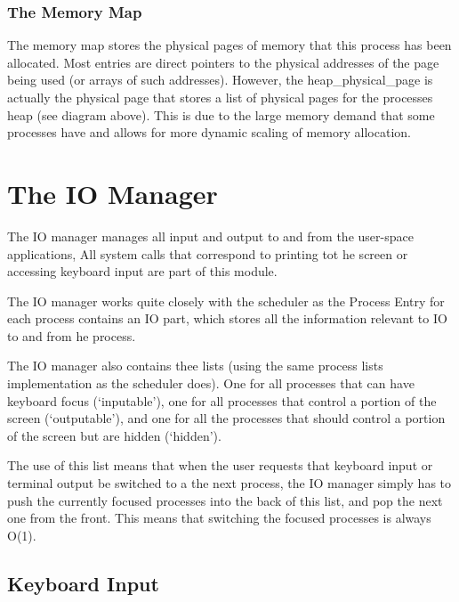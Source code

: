 \documentclass[a4paper]{report}
\begin{document}
\subsubsection{The Memory Map}

The memory map stores the physical pages of memory that this process has been allocated. Most entries are direct pointers to the physical addresses of the page being used (or arrays of such addresses). However, the heap\_physical\_page is actually the physical page that stores a list of physical pages for the processes heap (see diagram above). This is due to the large memory demand that some processes have and allows for more dynamic scaling of memory allocation.


















\clearpage

\section{The IO Manager}

The IO manager manages all input and output to and from the user-space applications, All system calls that correspond to printing tot he screen or accessing keyboard input are part of this module.

The IO manager works quite closely with the scheduler as the Process Entry for each process contains an IO part, which stores all the information relevant to IO to and from he process.

The IO manager also contains thee lists (using the same process lists implementation as the scheduler does). One for all processes that can have keyboard focus (`inputable'), one for all processes that control a portion of the screen (`outputable'), and one for all the processes that should control a portion of the screen but are hidden (`hidden').

The use of this list means that when the user requests that keyboard input or terminal output be switched to a the next process, the IO manager simply has to push the currently focused processes into the back of this list, and pop the next one from the front. This means that switching the focused processes is always O(1).

\subsection{Keyboard Input}
\end{document}
